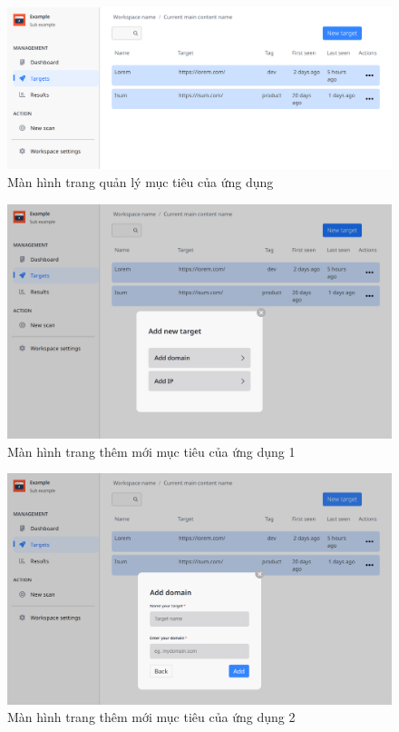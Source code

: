 \begin{figure}[H]
    \centering
    \includegraphics[width=\textwidth]{images/prototype/prototype_22112022/dashboard_target.png}
    \caption{Màn hình trang quản lý mục tiêu của ứng dụng }
\end{figure}

\begin{figure}[H]
    \centering
\includegraphics[width=\textwidth]{images/prototype/prototype_22112022/dashboard_target_add target.png}
    \caption{Màn hình trang thêm mới mục tiêu của ứng dụng 1}
\end{figure}

\begin{figure}[H]
    \centering
    \includegraphics[width=\textwidth]{images/prototype/prototype_22112022/dashboard_target_add target_add domain.png}
    \caption{Màn hình trang thêm mới mục tiêu của ứng dụng 2}
\end{figure}

